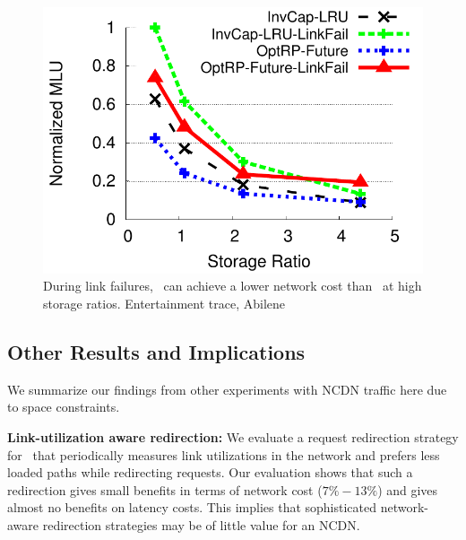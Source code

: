 {\begin{figure}
\begin{center}
\includegraphics[scale=0.45]{graphSet1/linkfailurecompare/AbileneVideos.pdf}
\end{center}
\vspace{-0.25in}
\caption{During link failures, \invlru\ can achieve a lower network cost than \optrpfuture\ at high storage ratios. Entertainment trace, Abilene}
\vspace{-0.2in}
\label{fig:linkfailurecompare}
\end{figure}

}

\subsection{Other Results and Implications}
\label{sec:additional}

We summarize our findings from  other experiments with NCDN traffic here due to space constraints.

{\bf Link-utilization aware redirection:}
We evaluate a request redirection strategy for \invlru\ that periodically measures link utilizations in the network and prefers less loaded paths while redirecting requests.
Our evaluation shows that such a redirection gives small benefits in terms of network cost ($7\%-13\%$) and gives almost no benefits on latency costs. 
This implies that sophisticated network-aware redirection strategies  may be of little value for an NCDN. 

